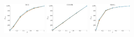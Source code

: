 \documentclass[a4paper]{report}
\newcommand{\wratio}{0.16}
\begin{document}
\vfill
\includegraphics[width=\wratio\textwidth]{influence/DIGG/fs_digg}\hfill
\includegraphics[width=\wratio\textwidth]{influence/EGO_FB/fs_ego_fb}\hfill
\includegraphics[width=\wratio\textwidth]{influence/EMAIL/fs_email}\hfill
\end{document}
